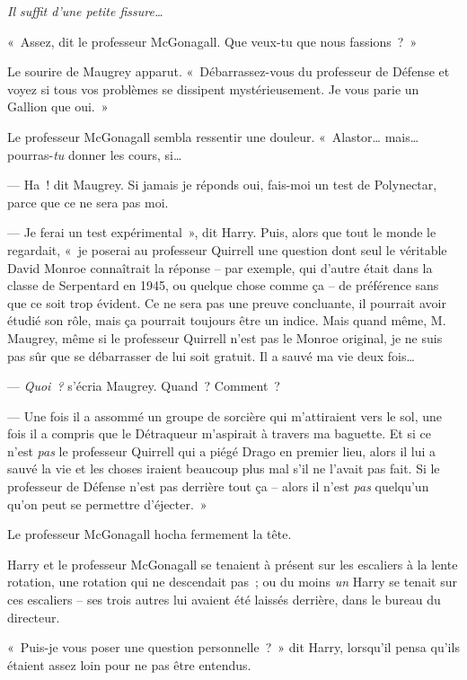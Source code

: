 \emph{Il suffit d'une petite fissure…}

«~Assez, dit le professeur McGonagall. Que veux-tu que nous fassions~?~»

Le sourire de Maugrey apparut. «~Débarrassez-vous du professeur de Défense et voyez si tous vos problèmes se dissipent mystérieusement. Je vous parie un Gallion que oui.~»

Le professeur McGonagall sembla ressentir une douleur.
«~Alastor… mais… pourras-\emph{tu} donner les cours, si…

--- Ha~! dit Maugrey. Si jamais je réponds oui, fais-moi un test de Polynectar, parce que ce ne sera pas moi.

--- Je ferai un test expérimental~», dit Harry. Puis, alors que tout le monde le regardait, «~je poserai au professeur Quirrell une question dont seul le véritable David Monroe connaîtrait la réponse -- par exemple, qui d'autre était dans la classe de Serpentard en 1945, ou quelque chose comme ça -- de préférence sans que ce soit trop évident. Ce ne sera pas une preuve concluante, il pourrait avoir étudié son rôle, mais ça pourrait toujours être un indice. Mais quand même, M. Maugrey, même si le professeur Quirrell n'est pas le Monroe original, je ne suis pas sûr que se débarrasser de lui soit gratuit. Il a sauvé ma vie deux fois…

--- \emph{Quoi~?} s'écria Maugrey. Quand~? Comment~?

--- Une fois il a assommé un groupe de sorcière qui m'attiraient vers le sol, une fois il a compris que le Détraqueur m'aspirait à travers ma baguette. Et si ce n'est \emph{pas} le professeur Quirrell qui a piégé Drago en premier lieu, alors il lui a sauvé la vie et les choses iraient beaucoup plus mal s'il ne l'avait pas fait. Si le professeur de Défense n'est pas derrière tout ça -- alors il n'est \emph{pas} quelqu'un qu'on peut se permettre d'éjecter.~»

Le professeur McGonagall hocha fermement la tête.


Harry et le professeur McGonagall se tenaient à présent sur les escaliers à la lente rotation, une rotation qui ne descendait pas~; ou du moins \emph{un} Harry se tenait sur ces escaliers -- ses trois autres lui avaient été laissés derrière, dans le bureau du directeur.

«~Puis-je vous poser une question personnelle~?~» dit Harry, lorsqu'il pensa qu'ils étaient assez loin pour ne pas être entendus.

